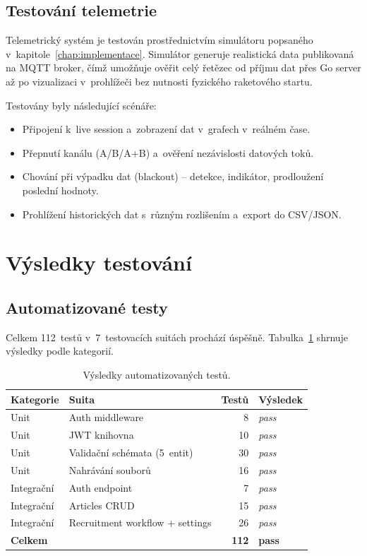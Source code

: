 \subsection{Testování telemetrie}

Telemetrický systém je testován prostřednictvím simulátoru popsaného v~kapitole~\ref{chap:implementace}. Simulátor generuje realistická data publikovaná na MQTT broker, čímž umožňuje ověřit celý řetězec od příjmu dat přes Go server až po vizualizaci v~prohlížeči bez nutnosti fyzického raketového startu.

Testovány byly následující scénáře:
\begin{itemize}
    \item Připojení k~live session a~zobrazení dat v~grafech v~reálném čase.
    \item Přepnutí kanálu (A/B/A+B) a~ověření nezávislosti datových toků.
    \item Chování při výpadku dat (blackout) -- detekce, indikátor, prodloužení poslední hodnoty.
    \item Prohlížení historických dat s~různým rozlišením a~export do CSV/JSON.
\end{itemize}

\section{Výsledky testování}

\subsection{Automatizované testy}

Celkem 112~testů v~7~testovacích suitách prochází úspěšně. Tabulka~\ref{tab:test-results} shrnuje výsledky podle kategorií.

\begin{table}[ht]
\centering
\small
\begin{tabular}{llrl}
\hline
\textbf{Kategorie} & \textbf{Suita} & \textbf{Testů} & \textbf{Výsledek} \\
\hline
Unit & Auth middleware & 8 & \textit{pass} \\
Unit & JWT knihovna & 10 & \textit{pass} \\
Unit & Validační schémata (5~entit) & 30 & \textit{pass} \\
Unit & Nahrávání souborů & 16 & \textit{pass} \\
Integrační & Auth endpoint & 7 & \textit{pass} \\
Integrační & Articles CRUD & 15 & \textit{pass} \\
Integrační & Recruitment workflow + settings & 26 & \textit{pass} \\
\hline
\textbf{Celkem} & & \textbf{112} & \textbf{pass} \\
\hline
\end{tabular}
\caption{Výsledky automatizovaných testů.}
\label{tab:test-results}
\end{table}

